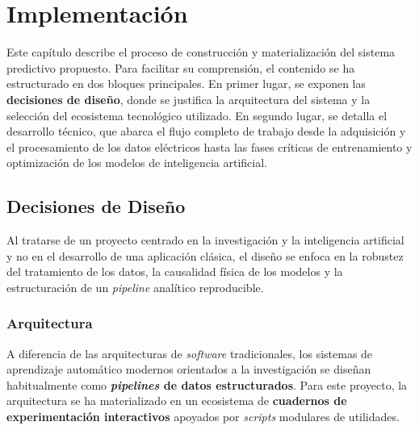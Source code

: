 \chapter{Implementación}\label{cap:implementacion}
Este capítulo describe el proceso de construcción y materialización del sistema predictivo propuesto. Para facilitar su comprensión, el contenido se ha estructurado en dos bloques principales. En primer lugar, se exponen las \textbf{decisiones de diseño}, donde se justifica la arquitectura del sistema y la selección del ecosistema tecnológico utilizado. En segundo lugar, se detalla el desarrollo técnico, que abarca el flujo completo de trabajo desde la adquisición y el procesamiento de los datos eléctricos hasta las fases críticas de entrenamiento y optimización de los modelos de inteligencia artificial.

\section{Decisiones de Diseño}
Al tratarse de un proyecto centrado en la investigación y la inteligencia artificial y no en el desarrollo de una aplicación clásica, el diseño se enfoca en la robustez del tratamiento de los datos, la causalidad física de los modelos y la estructuración de un \textit{pipeline} analítico reproducible.

\subsection{Arquitectura}
A diferencia de las arquitecturas de \textit{software} tradicionales, los sistemas de aprendizaje automático modernos orientados a la investigación se diseñan habitualmente como \textbf{\textit{pipelines} de datos estructurados}. Para este proyecto, la arquitectura se ha materializado en un ecosistema de \textbf{cuadernos de experimentación interactivos} apoyados por \textit{scripts} modulares de utilidades.

